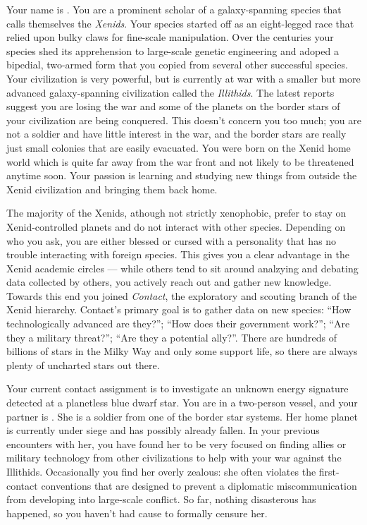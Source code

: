 \documentclass[char]{guildcamp1}
\begin{document}
\name{\cPassive{}}

Your name is \cPassive{\name}. You are a prominent scholar of a galaxy-spanning species that calls themselves the \emph{Xenids}. Your species started off as an eight-legged race that relied upon bulky claws for fine-scale manipulation. Over the centuries your species shed its apprehension to large-scale genetic engineering and adoped a bipedial, two-armed form that you copied from several other successful species. Your civilization is very powerful, but is currently at war with a smaller but more advanced galaxy-spanning civilization called the \emph{Illithids}. The latest reports suggest you are losing the war and some of the planets on the border stars of your civilization are being conquered. This doesn't concern you too much; you are not a soldier and have little interest in the war, and the border stars are really just small colonies that are easily evacuated. You were born on the Xenid home world which is quite far away from the war front and not likely to be threatened anytime soon. Your passion is learning and studying new things from outside the Xenid civilization and bringing them back home.

The majority of the Xenids, athough not strictly xenophobic, prefer to stay on Xenid-controlled planets and do not interact with other species. Depending on who you ask, you are either blessed or cursed with a personality that has no trouble interacting with foreign species. This gives you a clear advantage in the Xenid academic circles --- while others tend to sit around analzying and debating data collected by others, you actively reach out and gather new knowledge. Towards this end you joined \emph{Contact}, the exploratory and scouting branch of the Xenid hierarchy. Contact's primary goal is to gather data on new species: ``How technologically advanced are they?''; ``How does their government work?''; ``Are they a military threat?''; ``Are they a potential ally?''. There are hundreds of billions of stars in the Milky Way and only some support life, so there are always plenty of uncharted stars out there.

Your current contact assignment is to investigate an unknown energy signature detected at a planetless blue dwarf star. You are in a two-person vessel, and your partner is \cActive{\name}. She is a soldier from one of the border star systems. Her home planet is currently under siege and has possibly already fallen. In your previous encounters with her, you have found her to be very focused on finding allies or military technology from other civilizations to help with your war against the Illithids. Occasionally you find her overly zealous: she often violates the first-contact conventions that are designed to prevent a diplomatic miscommunication from developing into large-scale conflict. So far, nothing disasterous has happened, so you haven't had cause to formally censure her.
\end{document}
